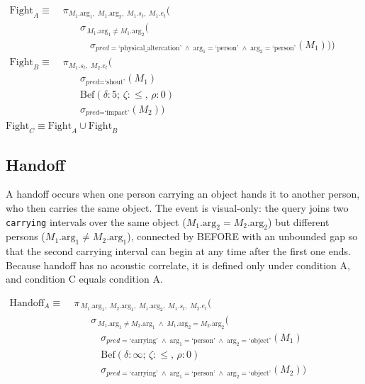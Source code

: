 \begin{flushleft}
$\begin{aligned}
\mathrm{Fight}_A \equiv &\; \pi_{M_1.\mathrm{arg}_1,\; M_1.\mathrm{arg}_2,\; M_1.s_t,\; M_1.e_t} ( \\
&\qquad \sigma_{\,M_1.\mathrm{arg}_1 \neq M_1.\mathrm{arg}_2} ( \\
&\qquad\quad \sigma_{\textit{pred}=\text{`physical\_altercation'} \;\land\; \mathrm{arg}_1=\text{`person'} \;\land\; \mathrm{arg}_2=\text{`person'}}(M_1) ) )
\end{aligned}$\\[6pt]
$\begin{aligned}
\mathrm{Fight}_B \equiv &\; \pi_{M_1.s_t,\; M_2.e_t} ( \\
&\qquad \sigma_{\textit{pred}=\text{`shout'}}(M_1) \\
          &\qquad \mathrm{Bef}(\delta:5;\,\zeta:\le,\,\rho:0) \\
          &\qquad \sigma_{\textit{pred}=\text{`impact'}}(M_2))
\end{aligned}$\\[6pt]
$\mathrm{Fight}_C \equiv \mathrm{Fight}_A \cup \mathrm{Fight}_B$
\end{flushleft}

\subsection{Handoff}

A handoff occurs when one person carrying an object hands it to another person, who then carries the same object. The event is visual-only: the query joins two \texttt{carrying} intervals over the same object ($M_1.\mathrm{arg}_2 = M_2.\mathrm{arg}_2$) but different persons ($M_1.\mathrm{arg}_1 \neq M_2.\mathrm{arg}_1$), connected by BEFORE with an unbounded gap so that the second carrying interval can begin at any time after the first one ends. Because handoff has no acoustic correlate, it is defined only under condition A, and condition C equals condition A.

\begin{flushleft}
$\begin{aligned}
\mathrm{Handoff}_A \equiv &\; \pi_{\,M_1.\mathrm{arg}_1,\; M_2.\mathrm{arg}_1,\; M_1.\mathrm{arg}_2,\; M_1.s_t,\; M_2.e_t} ( \\
&\qquad \sigma_{\,M_1.\mathrm{arg}_1 \neq M_2.\mathrm{arg}_1 \;\land\; M_1.\mathrm{arg}_2 = M_2.\mathrm{arg}_2} ( \\
&\qquad\quad \sigma_{\textit{pred}=\text{`carrying'} \;\land\; \mathrm{arg}_1=\text{`person'} \;\land\; \mathrm{arg}_2=\text{`object'}}(M_1) \\
          &\qquad\quad \mathrm{Bef}(\delta:\infty;\,\zeta:\le,\,\rho:0) \\
&\qquad\quad \sigma_{\textit{pred}=\text{`carrying'} \;\land\; \mathrm{arg}_1=\text{`person'} \;\land\; \mathrm{arg}_2=\text{`object'}}(M_2) )
\end{aligned}$
\end{flushleft}

